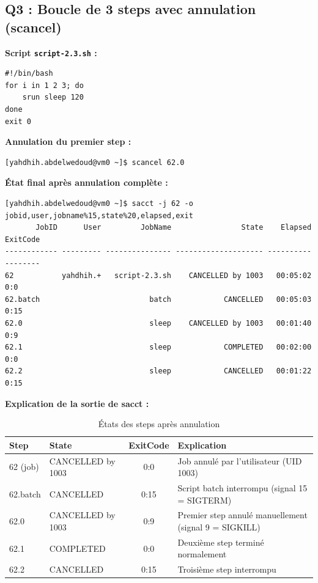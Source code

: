 \documentclass[12pt,a4paper]{article}
\newcommand{\code}[1]{\texttt{#1}}
\begin{document}
\subsection{Q3 : Boucle de 3 steps avec annulation (scancel)}

\textbf{Script \code{script-2.3.sh} :}
\begin{lstlisting}
#!/bin/bash
for i in 1 2 3; do
    srun sleep 120
done
exit 0
\end{lstlisting}

\textbf{Annulation du premier step :}
\begin{lstlisting}
[yahdhih.abdelwedoud@vm0 ~]$ scancel 62.0
\end{lstlisting}

\textbf{État final après annulation complète :}
\begin{lstlisting}
[yahdhih.abdelwedoud@vm0 ~]$ sacct -j 62 -o jobid,user,jobname%15,state%20,elapsed,exit
       JobID      User         JobName                State    Elapsed ExitCode 
------------ --------- --------------- -------------------- ---------- -------- 
62           yahdhih.+   script-2.3.sh    CANCELLED by 1003   00:05:02      0:0 
62.batch                         batch            CANCELLED   00:05:03     0:15 
62.0                             sleep    CANCELLED by 1003   00:01:40      0:9 
62.1                             sleep            COMPLETED   00:02:00      0:0 
62.2                             sleep            CANCELLED   00:01:22     0:15 
\end{lstlisting}

\textbf{Explication de la sortie de sacct :}

\begin{table}[h]
\centering
\begin{tabular}{|l|l|c|p{6cm}|}
\hline
\textbf{Step} & \textbf{State} & \textbf{ExitCode} & \textbf{Explication} \\
\hline
62 (job) & CANCELLED by 1003 & 0:0 & Job annulé par l'utilisateur (UID 1003) \\
62.batch & CANCELLED & 0:15 & Script batch interrompu (signal 15 = SIGTERM) \\
62.0 & CANCELLED by 1003 & 0:9 & Premier step annulé manuellement (signal 9 = SIGKILL) \\
62.1 & COMPLETED & 0:0 & Deuxième step terminé normalement \\
62.2 & CANCELLED & 0:15 & Troisième step interrompu \\
\hline
\end{tabular}
\caption{États des steps après annulation}
\end{table}
\end{document}
